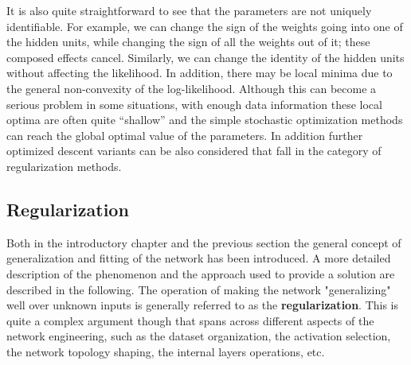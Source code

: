 
It is also quite straightforward to see that the parameters are not uniquely identifiable. For example, we can change the sign of the weights going into one of the hidden units, while changing the sign of all the weights out of it; these composed effects cancel. Similarly, we can change the identity of the hidden units without affecting the likelihood. 
In addition, there may be local minima due to the general non-convexity of the log-likelihood. Although this can become a serious problem in some situations, with enough data information these local optima are often quite “shallow” and the simple stochastic optimization methods can reach the global optimal value of the parameters. In addition further optimized descent variants can be also considered that fall in the category of regularization methods. 


\subsection{Regularization}
\label{section:training_regularization}
Both in the introductory chapter and the previous section the general concept of generalization and fitting of the network has been introduced. A more detailed description of the phenomenon and the approach used to provide a solution are described in the following.
The operation of making the network "generalizing" well over unknown inputs is generally referred to as the \textbf{regularization}. This is quite a complex argument though that spans across different aspects of the network engineering, such as the dataset organization, the activation selection, the network topology shaping, the internal layers operations, etc. 

